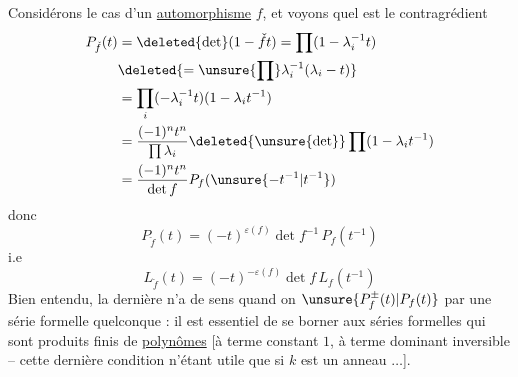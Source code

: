 
Considérons le cas d'un \uline{automorphisme} $f$, et voyons quel est le   contragrédient
\[
\begin{aligned}
P_{\check f}(t)&=\deleted{\det}(1-\check f t)=\prod(1-\lambda_i^{-1}t)\\
&\deleted{=\unsure{\prod}\lambda_i^{-1}(\lambda_i-t)}\\
&=\prod_i(-\lambda_i^{-1}t)(1-\lambda_i t^{-1})\\
&=\frac{(-1)^n t^n}{\prod\lambda_i}\deleted{\unsure{\det}}\prod(1-\lambda_i t^{-1})\\
&=\frac{(-1)^n t^n}{\det f}P_f(\unsure{-t^{-1}|t^{-1}})
\end{aligned}
\]
donc
\deleted{
\[
P_{\check f}(t)=\deleted{\frac{\unsure{(-1)^n t^n}}{\det f}}\unsure{\varepsilon(f)}t^nP_f(t^{-1})\qquad\unsure{\varepsilon(f)}=
\]
}
\[
\boxed{P_{\check f}(t)=(-t)^{\varepsilon(f)}\det f^{-1}\,P_f(t^{-1})}
\]
i.e
\[
\boxed{L_{\check f}(t)=(-t)^{-\varepsilon(f)}\det f\,L_f(t^{-1})}
\]
Bien entendu, la dernière n'a  de sens quand on  $\unsure{P_f^{\pm}(t)|P_f(t)}$ par une série formelle quelconque : il est essentiel de se borner aux séries formelles qui sont produits  finis de \uline{polynômes} [à terme constant $1$, à terme dominant inversible -- cette dernière condition n'étant utile que si $k$ est un anneau  $\ldots$].

